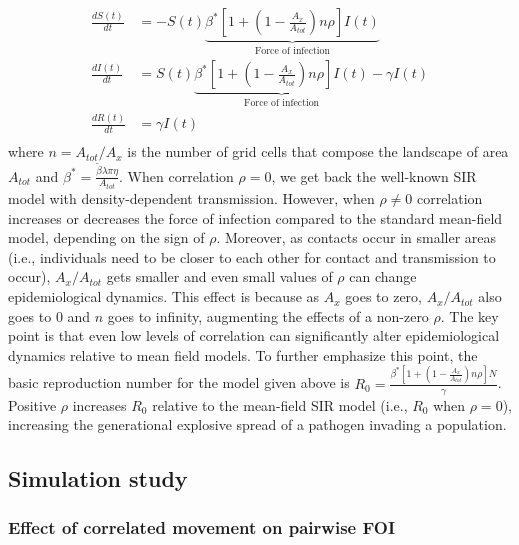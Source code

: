 ﻿\documentclass[11pt]{article}
\begin{document}
\begin{equation}
    \begin{aligned}
        \frac{d S(t)}{dt} &= - S(t) \underbrace{\beta^* [1 + (1 - \frac{A_x}{A_{tot}})n\rho] I(t)}_{\text{Force of infection}}  \\
        \frac{d I(t)}{dt} &=  S(t) \underbrace{\beta^* [1 + (1 - \frac{A_x}{A_{tot}})n\rho] I(t)}_{\text{Force of infection}} - \gamma I(t) \\
        \frac{d R(t)}{dt} &= \gamma I(t) \\
    \end{aligned}
    \label{eq:sir_with_corr}
\end{equation}
where $n = A_{tot} / A_{x}$ is the number of grid cells that compose the landscape of area $A_{tot}$ and $\beta^* = \frac{\tilde{\beta} \lambda \pi \eta}{A_{tot}}$. When correlation $\rho = 0$, we get back the well-known SIR model with density-dependent transmission.  However, when $\rho \neq 0$ correlation increases or decreases the force of infection compared to the standard mean-field model, depending on the sign of $\rho$.  Moreover, as contacts occur in smaller areas (i.e., individuals need to be closer to each other for contact and transmission to occur), $A_x / A_{tot}$ gets smaller and even small values of $\rho$ can change epidemiological dynamics.  This effect is because as $A_x$ goes to zero, $A_x / A_{tot}$ also goes to 0 and $n$ goes to infinity, augmenting the effects of a non-zero $\rho$. The key point is that even low levels of correlation can significantly alter epidemiological dynamics relative to mean field models.  To further emphasize this point, the basic reproduction number for the model given above is $R_0 = \frac{\beta^* [1 + (1 - \frac{A_x}{A_{tot}})n\rho] N}{\gamma}$. Positive $\rho$ increases $R_0$ relative to the mean-field SIR model (i.e., $R_0$ when $\rho = 0$), increasing the generational explosive spread of a pathogen invading a population.

\subsection*{Simulation study}

\subsubsection*{Effect of correlated movement on pairwise FOI}
\end{document}
